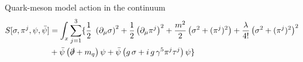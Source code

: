 Quark-meson model action in the continuum
\begin{align*}
    S[\sigma, \pi^j, \psi, \bar\psi] & = \int_x \sum_{j=1}^3 \{ \frac{1}{2} \ \left(\partial_\mu \sigma\right)^2 + \frac{1}{2} \left(\partial_\mu \pi^j \right)^2 + \frac{m^2}{2} \left(\sigma^2 + (\pi^j)^2\right) + \frac{\lambda}{4!} \left(\sigma^2 + (\pi^j)^2\right)^2 \\ 
    & + \bar \psi \left( \slashed{\partial} + m_q \right) \psi + \bar \psi \left(g \, \sigma + i \, g \,\gamma^5 \pi^j \tau^j\right) \psi \}
\end{align*}





